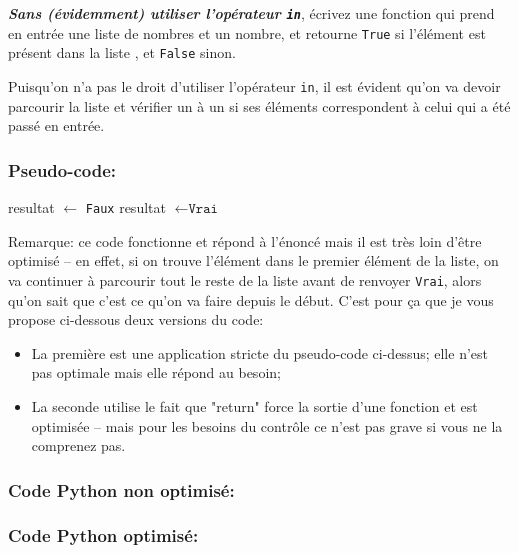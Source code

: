 \documentclass[12pt]{article}
\begin{document}
	\begin{MonExo}
		\textbf{\textit{Sans (évidemment) utiliser l'opérateur \texttt{in}}}, écrivez une fonction qui prend en entrée une liste de nombres et un nombre, et retourne \texttt{True} si l'élément est présent dans la liste , et \texttt{False} sinon.
	\end{MonExo}
	
	\begin{MaReponse}
		Puisqu'on n'a pas le droit d'utiliser l'opérateur \texttt{in}, il est évident qu'on va devoir parcourir la liste et vérifier un à un si ses éléments correspondent à celui qui a été passé en entrée.
		
		\subsubsection*{Pseudo-code:}
		\begin{algorithmic}[1]
			\State resultat $\leftarrow$ \texttt{Faux}
			\State resultat $\leftarrow \texttt{Vrai}$
			\EndIf
			\EndFor
			\State{}
			\EndFunction
		\end{algorithmic}
		
		Remarque: ce code fonctionne et répond à l'énoncé mais il est très loin d'être optimisé -- en effet, si on trouve l'élément dans le premier élément de la liste, on va continuer à parcourir tout le reste de la liste avant de renvoyer \texttt{Vrai}, alors qu'on sait que c'est ce qu'on va faire depuis le début. C'est pour ça que je vous propose ci-dessous deux versions du code:
		\begin{itemize}
			\item La première est une application stricte du pseudo-code ci-dessus; elle n'est pas optimale mais elle répond au besoin;
			\item La seconde utilise le fait que "return" force la sortie d'une fonction et est optimisée -- mais pour les besoins du contrôle ce n'est pas grave si vous ne la comprenez pas.
		\end{itemize}
		\subsubsection*{Code Python non optimisé:}
		\subsubsection*{Code Python optimisé:}
	\end{MaReponse}
	
\end{document}
